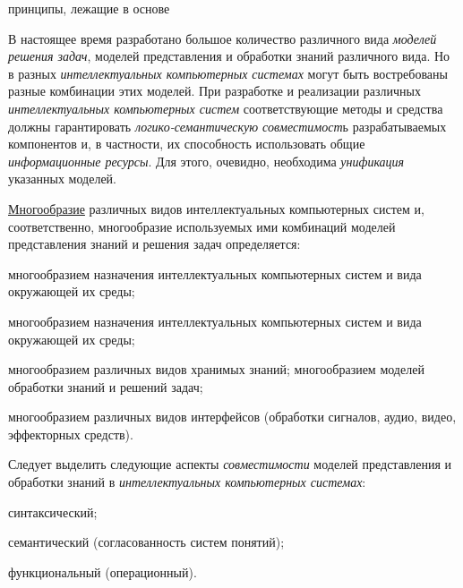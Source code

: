 \begin{SCn}
\begin{scnrelfromlistcustom}{принципы, лежащие в основе}
	\end{scnrelfromlistcustom}
\end{SCn}

В настоящее время разработано большое количество различного вида \textit{моделей решения задач}, моделей представления и обработки знаний различного вида. Но в разных \textit{интеллектуальных компьютерных системах} могут быть востребованы разные комбинации этих моделей. При разработке и реализации различных \textit{интеллектуальных компьютерных систем} соответствующие методы и средства должны гарантировать \textit{логико-семантическую совместимост}ь разрабатываемых компонентов и, в частности, их способность использовать общие \textit{информационные ресурсы}. Для этого, очевидно, необходима \textit{унификация} указанных моделей.

\underline{Многообразие} различных видов интеллектуальных компьютерных систем и, соответственно, многообразие используемых ими комбинаций моделей представления знаний и решения задач определяется:
\begin{textitemize}
	\item
	многообразием назначения интеллектуальных компьютерных систем и вида окружающей их среды;
	\item
	многообразием назначения интеллектуальных компьютерных систем и вида окружающей их среды;
	\item
	многообразием различных видов хранимых знаний; многообразием моделей обработки знаний и решений задач;
	\item
	многообразием различных видов интерфейсов (обработки сигналов, аудио, видео, эффекторных средств).
\end{textitemize}

Следует выделить следующие аспекты \textit{совместимости} моделей представления и обработки знаний в \textit{интеллектуальных компьютерных системах}:

\begin{textitemize}
	\item
	синтаксический;
	\item
	семантический (согласованность систем понятий);
	\item
	функциональный (операционный).
\end{textitemize}

